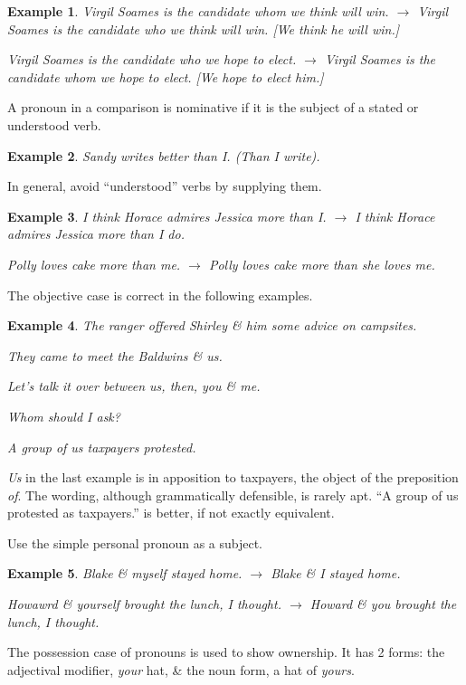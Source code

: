 \documentclass[oneside]{book}
\numberwithin{equation}{section}
\newtheorem{example}{Example}[chapter]
\begin{document}
\begin{example}
	Virgil Soames is the candidate whom we think will win. $\to$ Virgil Soames is the candidate who we think will win. [We think \emph{he} will win.]
	
	Virgil Soames is the candidate who we hope to elect. $\to$ Virgil Soames is the candidate whom we hope to elect. [We hope to elect \emph{him}.]
\end{example}
A pronoun in a comparison is nominative if it is the subject of a stated or understood verb.

\begin{example}
	Sandy writes better than I. (Than I write).
\end{example}
In general, avoid ``understood'' verbs by supplying them.

\begin{example}
	I think Horace admires Jessica more than I. $\to$ I think Horace admires Jessica more than I do.
	
	Polly loves cake more than me. $\to$ Polly loves cake more than she loves me.
\end{example}
The objective case is correct in the following examples.

\begin{example}
	The ranger offered Shirley \& him some advice on campsites.
	
	They came to meet the Baldwins \& us.
	
	Let's talk it over between us, then, you \& me.
	
	Whom should I ask?
	
	A group of us taxpayers protested.
\end{example}
\textit{Us} in the last example is in apposition to taxpayers, the object of the preposition \textit{of}. The wording, although grammatically defensible, is rarely apt. ``A group of us protested as taxpayers.'' is better, if not exactly equivalent.

Use the simple personal pronoun as a subject.

\begin{example}
	Blake \& myself stayed home. $\to$ Blake \& I stayed home.
	
	Howawrd \& yourself brought the lunch, I thought. $\to$ Howard \& you brought the lunch, I thought.
\end{example}
The possession case of pronouns is used to show ownership. It has 2 forms: the adjectival modifier, \textit{your} hat, \& the noun form, a hat of \textit{yours}.
\end{document}
